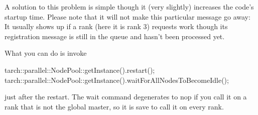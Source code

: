 \noindent
A solution to this problem is simple though it (very slightly) increases the
code's startup time.
Please note that it will not make this particular message go away:  
It usually shows up if a rank (here it is rank 3) requests work though its
registration message is still in the queue and hasn't been processed yet.

What you can do is invoke 
\begin{code}
  tarch::parallel::NodePool::getInstance().restart();
  tarch::parallel::NodePool::getInstance().waitForAllNodesToBecomeIdle();
\end{code}
\noindent
just after the restart.
The wait command degenerates to nop if you call it on a rank that is not the
global master, so it is save to call it on every rank.
